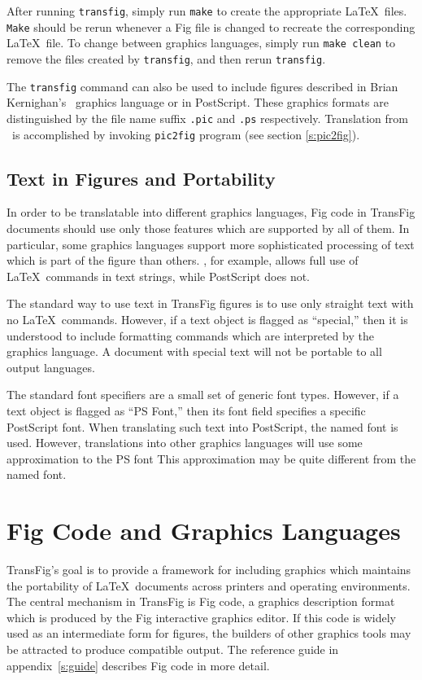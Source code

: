 After running {\tt transfig}, simply run {\tt make} to create the
	appropriate \LaTeX\ files.
{\tt Make} should be rerun whenever a Fig file is changed to recreate
	the corresponding \LaTeX\ file.
To change between graphics languages, simply run {\tt make clean} to
	remove the files created by {\tt transfig}, and then rerun
	{\tt transfig}.

The {\tt transfig} command can also be used to include figures described in
	Brian Kernighan's \PIC\ graphics language or in PostScript.
These graphics formats are distinguished by the file name suffix
	{\tt .pic} and {\tt .ps} respectively.
Translation from \PIC\ is accomplished by invoking {\tt pic2fig} program
	(see section \ref{s:pic2fig}).

\subsection{Text in Figures and Portability}
\label{s:portability}

In order to be translatable into different graphics languages, Fig code
	in TransFig documents should use only those features which
	are supported by all of them.
In particular, some graphics languages support more sophisticated processing
	of text which is part of the figure than others.
\PicTeX, for example, allows full use of \LaTeX\ commands in text strings,
	while PostScript does not.

The standard way to use text in TransFig figures is to use only
	straight text with no \LaTeX\ commands.
However, if a text object is flagged as ``special,''
	then it is understood to include formatting commands which are
	interpreted by the graphics language.
A document with special text will not be portable to all output languages.

The standard font specifiers are a small set of generic font types.
However, if a text object is flagged as ``PS Font,'' then its font field
	specifies a specific PostScript font.
When translating such text into PostScript, the named font is used.
However, translations into other graphics languages will use some
	approximation to the PS font
This approximation may be quite different from the named font.

\vfill
\pagebreak
\section{Fig Code and Graphics Languages}
\label{s:languages}

TransFig's goal is to provide a framework for including graphics which
	maintains the portability of \LaTeX\ documents across
	printers and operating environments.
The central mechanism in TransFig is Fig code, a graphics description
	format which is produced by the Fig interactive graphics editor.
If this code is widely used as an intermediate form for figures,
	the builders of other graphics tools may be attracted
	to produce compatible output.
The reference guide in appendix~\ref{s:guide} describes Fig code in more
	detail.

